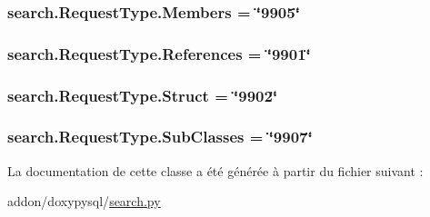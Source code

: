 \subsubsection[{Members}]{ search.\+Request\+Type.\+Members = \char`\"{}9905\char`\"{}\hspace{0.3cm}{\ttfamily [static]}}\label{classsearch_1_1_request_type_a610b07848237d0ae74a6d2df7876db02}
\hypertarget{classsearch_1_1_request_type_ac366ecff13e29a1e9de0626e72a10e15}{}
\subsubsection[{References}]{ search.\+Request\+Type.\+References = \char`\"{}9901\char`\"{}\hspace{0.3cm}{\ttfamily [static]}}\label{classsearch_1_1_request_type_ac366ecff13e29a1e9de0626e72a10e15}
\hypertarget{classsearch_1_1_request_type_a6db1aa20748192d736732e4f19b3a6f2}{}
\subsubsection[{Struct}]{ search.\+Request\+Type.\+Struct = \char`\"{}9902\char`\"{}\hspace{0.3cm}{\ttfamily [static]}}\label{classsearch_1_1_request_type_a6db1aa20748192d736732e4f19b3a6f2}
\hypertarget{classsearch_1_1_request_type_a9bab5f69fb129e5a373ee06284ce615b}{}
\subsubsection[{Sub\+Classes}]{ search.\+Request\+Type.\+Sub\+Classes = \char`\"{}9907\char`\"{}\hspace{0.3cm}{\ttfamily [static]}}\label{classsearch_1_1_request_type_a9bab5f69fb129e5a373ee06284ce615b}


La documentation de cette classe a été générée à partir du fichier suivant \+:\begin{DoxyCompactItemize}
\item 
addon/doxypysql/\hyperlink{search_8py}{search.\+py}\end{DoxyCompactItemize}
